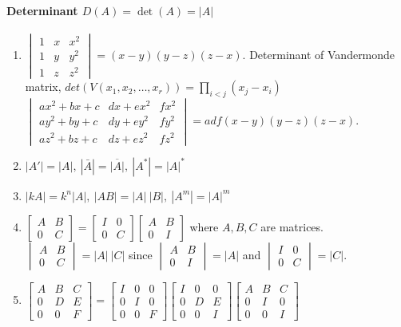 \paragraph{Determinant $D(A) = \det(A) = |A|$}
\begin{enumerate}
	\item $\begin{vmatrix}1 & x & x^2 \\ 1 & y & y^2 \\ 1 & z & z^2 \end{vmatrix} = (x-y)(y-z)(z-x)$.
		\subitem Determinant of Vandermonde matrix, $det(V(x_1,x_2,\dots,x_r)) = \prod_{i < j} (x_j-x_i)$
		\subitem $\begin{vmatrix}ax^2+bx+c & dx+ex^2 & fx^2 \\ ay^2+by+c & dy+ey^2 & fy^2 \\ az^2+bz+c & dz+ez^2 & fz^2 \end{vmatrix} = adf(x-y)(y-z)(z-x)$.
	\item $|A'| = |A|,\ |\bar{A}|=\overline{|A|},\ |A^\ast| = |A|^\ast$
	\item $|kA| = k^n|A|,\ |AB| = |A|\ |B|,\ |A^m| = |A|^m$
	\item $\begin{bmatrix} A & B \\ 0 & C \end{bmatrix} = \begin{bmatrix} I & 0 \\ 0 & C \end{bmatrix} \begin{bmatrix} A & B \\ 0 & I \end{bmatrix}$ where $A,B,C$ are matrices.
	\subitem $\begin{vmatrix} A & B \\ 0 & C \end{vmatrix} = |A|\ |C|$ since $\begin{vmatrix} A & B \\ 0 & I \end{vmatrix} = |A|$ and $\begin{vmatrix} I & 0 \\ 0 & C \end{vmatrix} = |C|$.
	\item $\begin{bmatrix} A & B & C \\ 0 & D & E \\ 0 & 0 & F \end{bmatrix} = \begin{bmatrix} I & 0 & 0 \\ 0 & I & 0 \\ 0 & 0 & F \end{bmatrix}\begin{bmatrix} I & 0 & 0 \\ 0 & D & E \\ 0 & 0 & I \end{bmatrix} \begin{bmatrix} A & B & C \\ 0 & I & 0 \\ 0 & 0 & I \end{bmatrix}$

\end{enumerate}

